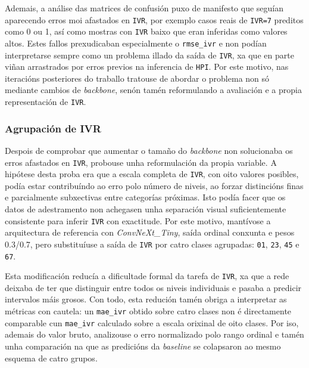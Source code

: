 Ademais, a análise das matrices de confusión puxo de manifesto que seguían aparecendo erros moi
afastados en \texttt{IVR}, por exemplo casos reais de \texttt{IVR=7} preditos como 0 ou 1, así como mostras con
\texttt{IVR} baixo que eran inferidas como valores altos. Estes fallos prexudicaban especialmente o
\texttt{rmse\_ivr} e non podían interpretarse sempre como un problema illado da saída de
\texttt{IVR}, xa que en parte viñan arrastrados por erros previos na inferencia de \texttt{HPI}. Por
este motivo, nas iteracións posteriores do traballo tratouse de abordar o problema non só mediante
cambios de \textit{backbone}, senón tamén reformulando a avaliación e a propia representación de
\texttt{IVR}.

\subsubsection{Agrupación de IVR}
Despois de comprobar que aumentar o tamaño do \textit{backbone} non solucionaba os erros afastados
en \texttt{IVR}, probouse unha reformulación da propia variable. A hipótese desta proba era que a
escala completa de \texttt{IVR}, con oito valores posibles, podía estar contribuíndo ao erro polo
número de niveis, ao forzar distincións finas e parcialmente subxectivas entre categorías próximas.
Isto podía facer que os datos de adestramento non achegasen unha separación visual suficientemente
consistente para inferir \texttt{IVR} con exactitude. Por este motivo, mantívose a arquitectura de
referencia con \textit{ConvNeXt\_Tiny}, saída ordinal conxunta e pesos 0.3/0.7, pero substituíuse a
saída de \texttt{IVR} por catro clases agrupadas: \texttt{01}, \texttt{23}, \texttt{45} e
\texttt{67}.

Esta modificación reducía a dificultade formal da tarefa de \texttt{IVR}, xa que a rede deixaba de
ter que distinguir entre todos os niveis individuais e pasaba a predicir intervalos máis grosos. Con
todo, esta redución tamén obriga a interpretar as métricas con cautela: un \texttt{mae\_ivr} obtido
sobre catro clases non é directamente comparable cun \texttt{mae\_ivr} calculado sobre a escala
orixinal de oito clases. Por iso, ademais do valor bruto, analizouse o erro normalizado polo rango
ordinal e tamén unha comparación na que as predicións da \textit{baseline} se colapsaron ao mesmo
esquema de catro grupos.


